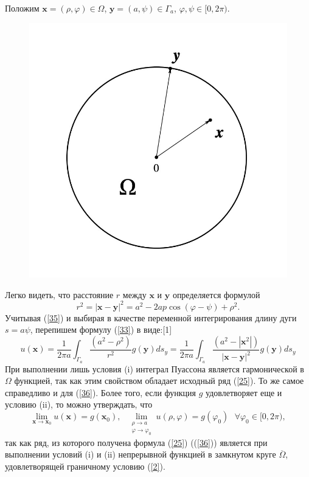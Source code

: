 \documentclass[14pt, a4paper]{extarticle}
\let\oldref\ref
\renewcommand{\ref}[1]{(\oldref{#1})}
\begin{document}
					Положим $\mathbf{x} = (\rho, \varphi) \in \Omega$, $\mathbf{y} = (a, \psi) \in \Gamma_a$, $\varphi, \psi \in [0, 2\pi)$.
					\begin{figure}[H]
						\centering
						\includegraphics[width = .42\linewidth]{2.jpg}
						\caption[.] {}
					\end{figure}
					\noindent Легко видеть, что расстояние $r$ между $\mathbf{x}$ и $\mathbf{y}$ определяется формулой
					\begin{equation}
						r^2 = | \mathbf{x} - \mathbf{y} |^2 = a^2 - 2ap\cos{(\varphi - \psi)} + \rho^2. \label{35}
					\end{equation}
					Учитывая \ref{35} и выбирая в качестве переменной интегрирования длину дуги $ s = a\psi$, перепишем формулу  \ref{33} в виде:[1]
					\begin{equation}
						u(\mathbf{x}) = \dfrac{1}{2\pi a} \int_{\Gamma_a} \dfrac{(a^2 - \rho^2)}{r^2} g(\mathbf{y}) ds_y = \dfrac{1}{2\pi a} \int_{\Gamma_a} \dfrac{(a^2 - |\mathbf{x}^2|)}{ |\mathbf{x} - \mathbf{y}|^2 } g(\mathbf{y}) ds_y \label{36}
					\end{equation}
					При выполнении лишь условия (i) интеграл Пуассона является гармонической в $\Omega$ функцией, так как этим свойством обладает исходный ряд \ref{25}. То же самое справедливо и для \ref{36}. Более того, если функция $g$ удовлетворяет еще и условию (ii), то можно утверждать, что
					\begin{equation}
						\lim_{\mathbf{x} \rightarrow \mathbf{x}_0} u(\mathbf{x}) = g(\mathbf{x}_0), \:\:\: \lim_{\substack{\rho \rightarrow a \\ \varphi \rightarrow \varphi_0}} u(\rho, \varphi) = g(\varphi_0) \:\:\: \forall \varphi_0 \in [0, 2\pi), \label{37}
					\end{equation}
					так как ряд, из которого получена формула \ref{25} (\ref{36}) является при выполнении условий (i) и (ii) непрерывной функцией в замкнутом круге $\overline{\Omega}$, удовлетворящей граничному условию \ref{2}.
				
\end{document}
